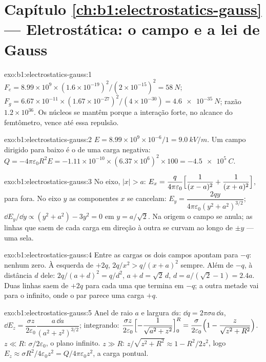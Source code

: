 \section*{Capítulo \ref{ch:b1:electrostatics-gauss} --- Eletrostática: o campo e a lei de Gauss}

\begin{solution}{exo:b1:electrostatics-gauss:1}
$F_e = 8.99 \times 10^9 \times (1.6 \times 10^{-19})^2/(2 \times 10^{-15})^2 = \qty{58}{N}$;
$F_g = 6.67 \times 10^{-11} \times (1.67 \times 10^{-27})^2/(4 \times 10^{-30}) =
\qty{4.6e-35}{N}$; razão $1.2 \times 10^{36}$. Os núcleos se mantêm porque a
interação forte, no alcance do femtômetro, vence até essa repulsão.
\end{solution}

\begin{solution}{exo:b1:electrostatics-gauss:2}
$E = 8.99 \times 10^9 \times 10^{-6}/1 = \qty{9.0}{kV/m}$. Um campo dirigido para baixo é
o de uma carga negativa: $Q = -4\pi\varepsilon_0R^2E = -1.11 \times 10^{-10} \times
(6.37 \times 10^6)^2 \times 100 = \qty{-4.5e5}{C}$.
\end{solution}

\begin{solution}{exo:b1:electrostatics-gauss:3}
No eixo, $|x| > a$: $E_x = \dfrac{q}{4\pi\varepsilon_0}\Bigl[\dfrac{1}{(x - a)^2} +
\dfrac{1}{(x + a)^2}\Bigr]$, para fora. No eixo $y$ as componentes $x$ se
cancelam: $E_y = \dfrac{2qy}{4\pi\varepsilon_0(y^2 + a^2)^{3/2}}$; $\dd E_y/\dd y \propto
(y^2 + a^2) - 3y^2 = 0$ em $y = a/\sqrt2$. Na origem o campo se
anula; as linhas que saem de cada carga em direção à outra se curvam ao longo de
$\pm y$ --- uma sela.
\end{solution}

\begin{solution}{exo:b1:electrostatics-gauss:4}
Entre as cargas os dois campos apontam para $-q$: nenhum zero. À esquerda de
$+2q$, $2q/x^2 > q/(x + a)^2$ sempre. Além de $-q$, à distância $d$ dele:
$2q/(a + d)^2 = q/d^2$, $a + d = \sqrt2\,d$, $d = a/(\sqrt2 - 1) = 2.4a$.
Duas linhas saem de $+2q$ para cada uma que termina em $-q$; a outra metade vai
para o infinito, onde o par parece uma carga $+q$.
\end{solution}

\begin{solution}{exo:b1:electrostatics-gauss:5}
Anel de raio $a$ e largura $\dd a$: $\dd q = 2\pi\sigma a\,\dd a$, $\dd E_z =
\dfrac{\sigma z}{2\varepsilon_0}\dfrac{a\,\dd a}{(a^2 + z^2)^{3/2}}$; integrando:
$\dfrac{\sigma z}{2\varepsilon_0}\Bigl[-\dfrac{1}{\sqrt{a^2 + z^2}}\Bigr]_0^R = \dfrac{\sigma}{2\varepsilon_0}
\Bigl(1 - \dfrac{z}{\sqrt{z^2 + R^2}}\Bigr)$. $z \ll R$: $\sigma/2\varepsilon_0$, o
plano infinito. $z \gg R$: $z/\sqrt{z^2 + R^2} \approx 1 - R^2/2z^2$, logo $E_z
\approx \sigma R^2/4\varepsilon_0z^2 = Q/4\pi\varepsilon_0z^2$, a carga pontual.
\end{solution}

